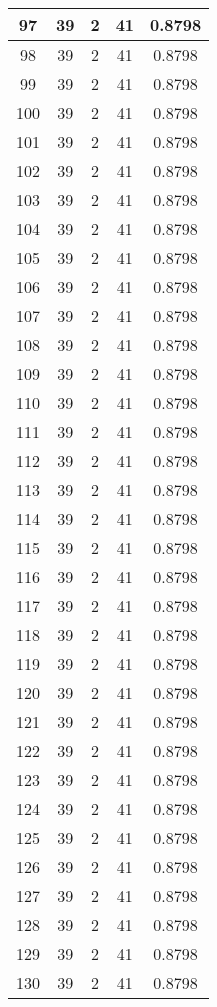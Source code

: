 \documentclass[letterpaper, 12pt]{article}
\begin{document}
\begin{longtable}{|c|c|c|c|c|}
\hline
97 & 39 & 2 & 41 & 0.8798 \\
\hline
98 & 39 & 2 & 41 & 0.8798 \\
\hline
99 & 39 & 2 & 41 & 0.8798 \\
\hline
100 & 39 & 2 & 41 & 0.8798 \\
\hline
101 & 39 & 2 & 41 & 0.8798 \\
\hline
102 & 39 & 2 & 41 & 0.8798 \\
\hline
103 & 39 & 2 & 41 & 0.8798 \\
\hline
104 & 39 & 2 & 41 & 0.8798 \\
\hline
105 & 39 & 2 & 41 & 0.8798 \\
\hline
106 & 39 & 2 & 41 & 0.8798 \\
\hline
107 & 39 & 2 & 41 & 0.8798 \\
\hline
108 & 39 & 2 & 41 & 0.8798 \\
\hline
109 & 39 & 2 & 41 & 0.8798 \\
\hline
110 & 39 & 2 & 41 & 0.8798 \\
\hline
111 & 39 & 2 & 41 & 0.8798 \\
\hline
112 & 39 & 2 & 41 & 0.8798 \\
\hline
113 & 39 & 2 & 41 & 0.8798 \\
\hline
114 & 39 & 2 & 41 & 0.8798 \\
\hline
115 & 39 & 2 & 41 & 0.8798 \\
\hline
116 & 39 & 2 & 41 & 0.8798 \\
\hline
117 & 39 & 2 & 41 & 0.8798 \\
\hline
118 & 39 & 2 & 41 & 0.8798 \\
\hline
119 & 39 & 2 & 41 & 0.8798 \\
\hline
120 & 39 & 2 & 41 & 0.8798 \\
\hline
121 & 39 & 2 & 41 & 0.8798 \\
\hline
122 & 39 & 2 & 41 & 0.8798 \\
\hline
123 & 39 & 2 & 41 & 0.8798 \\
\hline
124 & 39 & 2 & 41 & 0.8798 \\
\hline
125 & 39 & 2 & 41 & 0.8798 \\
\hline
126 & 39 & 2 & 41 & 0.8798 \\
\hline
127 & 39 & 2 & 41 & 0.8798 \\
\hline
128 & 39 & 2 & 41 & 0.8798 \\
\hline
129 & 39 & 2 & 41 & 0.8798 \\
\hline
130 & 39 & 2 & 41 & 0.8798 \\

\end{longtable}
\end{document}
